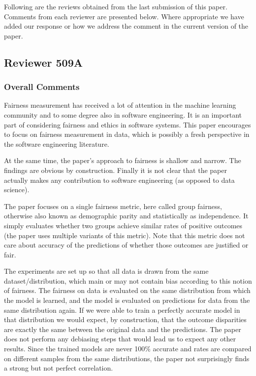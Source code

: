 \documentclass[conference]{IEEEtran}
\begin{document}




Following are the reviews obtained from the last submission of this
paper. Comments from each reviewer are presented below. Where
appropriate we have added our response or how we address the comment
in the current version of the paper.

\subsection{Reviewer 509A}
\subsubsection{Overall Comments}

Fairness measurement has received a lot of attention in the machine
learning community and to some degree also in software engineering. It
is an important part of considering fairness and ethics in software
systems. This paper encourages to focus on fairness measurement in
data, which is possibly a fresh perspective in the software
engineering literature.

At the same time, the paper’s approach to fairness is shallow and
narrow. The findings are obvious by construction. Finally it is not
clear that the paper actually makes any contribution to software
engineering (as opposed to data science).

The paper focuses on a single fairness metric, here called group
fairness, otherwise also known as demographic parity and statistically
as independence. It simply evaluates whether two groups achieve
similar rates of positive outcomes (the paper uses multiple variants
of this metric). Note that this metric does not care about accuracy of
the predictions of whether those outcomes are justified or fair.

The experiments are set up so that all data is drawn from the same
dataset/distribution, which main or may not contain bias according to
this notion of fairness. The fairness on data is evaluated on the same
distribution from which the model is learned, and the model is
evaluated on predictions for data from the same distribution again. If
we were able to train a perfectly accurate model in that distribution
we would expect, by construction, that the outcome disparities are
exactly the same between the original data and the predictions. The
paper does not perform any debiasing steps that would lead us to
expect any other results. Since the trained models are never 100\%
accurate and rates are compared on different samples from the same
distributions, the paper not surprisingly finds a strong but not
perfect correlation.
\end{document}
